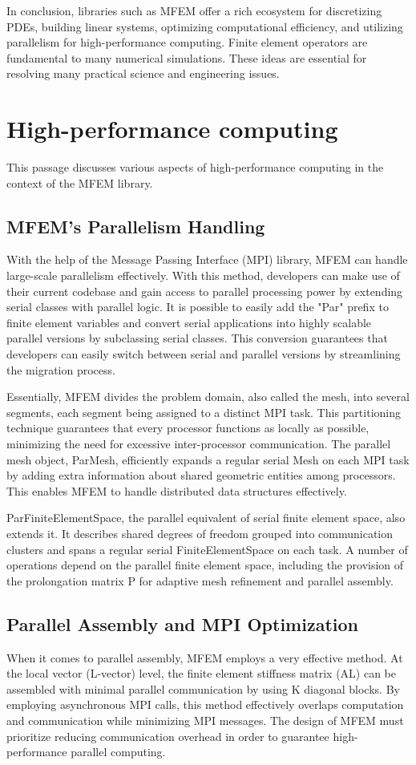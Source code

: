 \documentclass{article}
\begin{document}
In conclusion, libraries such as MFEM offer a rich ecosystem for discretizing PDEs, building linear systems, optimizing computational efficiency, and utilizing parallelism for high-performance computing. Finite element operators are fundamental to many numerical simulations. These ideas are essential for resolving many practical science and engineering issues.

\section{High-performance computing}
This passage discusses various aspects of high-performance computing in the context of the MFEM library.
\subsection{MFEM's Parallelism Handling}
With the help of the Message Passing Interface (MPI) library, MFEM can handle large-scale parallelism effectively. With this method, developers can make use of their current codebase and gain access to parallel processing power by extending serial classes with parallel logic. It is possible to easily add the "Par" prefix to finite element variables and convert serial applications into highly scalable parallel versions by subclassing serial classes. This conversion guarantees that developers can easily switch between serial and parallel versions by streamlining the migration process.

Essentially, MFEM divides the problem domain, also called the mesh, into several segments, each segment being assigned to a distinct MPI task. This partitioning technique guarantees that every processor functions as locally as possible, minimizing the need for excessive inter-processor communication. The parallel mesh object, ParMesh, efficiently expands a regular serial Mesh on each MPI task by adding extra information about shared geometric entities among processors. This enables MFEM to handle distributed data structures effectively.

ParFiniteElementSpace, the parallel equivalent of serial finite element space, also extends it. It describes shared degrees of freedom grouped into communication clusters and spans a regular serial FiniteElementSpace on each task. A number of operations depend on the parallel finite element space, including the provision of the prolongation matrix P for adaptive mesh refinement and parallel assembly.

\subsection{Parallel Assembly and MPI Optimization}
When it comes to parallel assembly, MFEM employs a very effective method. At the local vector (L-vector) level, the finite element stiffness matrix (AL) can be assembled with minimal parallel communication by using K diagonal blocks. By employing asynchronous MPI calls, this method effectively overlaps computation and communication while minimizing MPI messages. The design of MFEM must prioritize reducing communication overhead in order to guarantee high-performance parallel computing.
\end{document}
